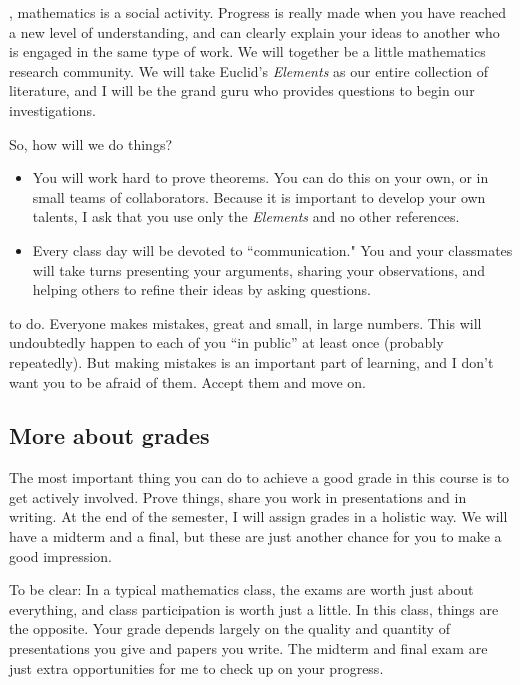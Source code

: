 \documentclass{tufte-handout}
\theoremstyle{definition}
\begin{document}
, mathematics is a social activity. 
Progress is really made when you have reached a new level of understanding, and can clearly explain your ideas to another who is engaged in the same type of work.
We will together be a little mathematics research community.
We will take Euclid's \emph{Elements} as our entire collection of literature, and I will be the grand guru who provides questions to begin our investigations.

So, how will we do things?
\begin{itemize}
\item You will work hard to prove theorems.
You can do this on your own, or in small teams of collaborators.
Because it is important to develop your own talents, I ask that you use only the \emph{Elements} and no other references.

\item Every class day will be devoted to ``communication."
You and your classmates will take turns presenting your arguments, sharing your observations, and helping others to refine their ideas by asking questions.
\end{itemize}



 to do.
Everyone makes mistakes, great and small, in large numbers.
This will undoubtedly happen to each of you ``in public'' at least once (probably repeatedly).
But making mistakes is an important part of learning, and I don't want you to be afraid of them.
Accept them and move on.

\subsection*{More about grades} 
The most important thing you can do to achieve a good grade in this course is to get actively involved.
Prove things, share you work in presentations and in writing.
At the end of the semester, I will assign grades in a holistic way.
We will have a midterm and a final, but these are just another chance for you to make a good impression. 

To be clear: In a typical mathematics class, the exams are worth just about everything, and class participation is worth just a little.
In this class, things are the opposite.
Your grade depends largely on the quality and quantity of presentations you give and papers you write.
The midterm and final exam are just extra opportunities for me to check up on your progress.
\end{document}
